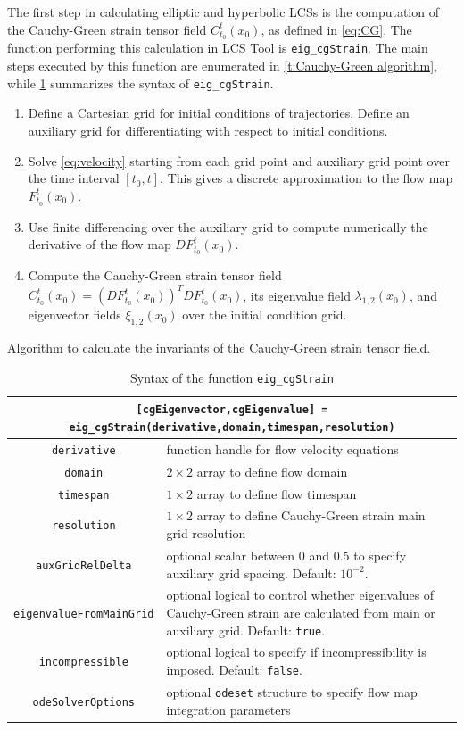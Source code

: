 \documentclass{elsarticle}
\begin{document}
The first step in calculating elliptic and hyperbolic LCSs is the computation of the Cauchy-Green strain tensor field $C_{t_0}^t(x_0)$, as defined in \cref{eq:CG}. The function performing this calculation in LCS Tool is \lstinline!eig_cgStrain!. The main steps executed by this function are enumerated in \cref{t:Cauchy-Green algorithm}, while \cref{t:eig_cgStrain syntax} summarizes the syntax of \lstinline!eig_cgStrain!.

\begin{table}
\begin{enumerate}
\item Define a Cartesian grid for initial conditions of trajectories. Define an auxiliary grid for differentiating with respect to initial conditions.
\item Solve \cref{eq:velocity} starting from each grid point and auxiliary grid point over the time interval $[t_0,t]$. This gives a discrete approximation to the flow map $F_{t_0}^t(x_0)$.
\item Use finite differencing over the auxiliary grid to compute numerically the derivative of the flow map $DF_{t_0}^t(x_0)$.
\item Compute the Cauchy-Green strain tensor field $C_{t_0}^t(x_0) = \left(DF_{t_0}^t(x_0)\right)^T DF_{t_0}^t(x_0)$, its eigenvalue field $\lambda_{1,2}(x_0)$, and eigenvector fields $\xi_{1,2}(x_0)$ over the initial condition grid.
\end{enumerate}
\caption{Algorithm to calculate the invariants of the Cauchy-Green strain tensor field.}
\label{t:Cauchy-Green algorithm}
\end{table}

\begin{table}
\begin{center}
\begin{tabular}{|c|p{}|}
\hline
\multicolumn{2}{|p{\textwidth}|}{\lstinline![cgEigenvector,cgEigenvalue] = eig_cgStrain(derivative,domain,timespan,resolution)!}\tabularnewline
\hline
\lstinline!derivative! & function handle for flow velocity equations\tabularnewline
\hline
\lstinline!domain! & $2 \times 2$ array to define flow domain\tabularnewline
\hline
\lstinline!timespan! & $1 \times 2$ array to define flow timespan\tabularnewline
\hline
\lstinline!resolution! & $1 \times 2$ array to define Cauchy-Green strain main grid resolution\tabularnewline
\hline
\lstinline!auxGridRelDelta! & optional scalar between 0 and 0.5 to specify auxiliary grid spacing. Default: $10^{-2}$.\tabularnewline
\hline
\lstinline!eigenvalueFromMainGrid! & optional logical to control whether eigenvalues of Cauchy-Green strain are calculated from main or auxiliary grid. Default: \lstinline!true!.\tabularnewline
\hline
\lstinline!incompressible! & optional logical to specify if incompressibility is imposed. Default: \lstinline!false!.\tabularnewline
\hline
\lstinline!odeSolverOptions! & optional \lstinline!odeset! structure to specify flow map integration parameters\tabularnewline
\hline
\end{tabular}
\caption{Syntax of the function \lstinline!eig_cgStrain!}
\label{t:eig_cgStrain syntax}
\end{center}
\end{table}
\end{document}
